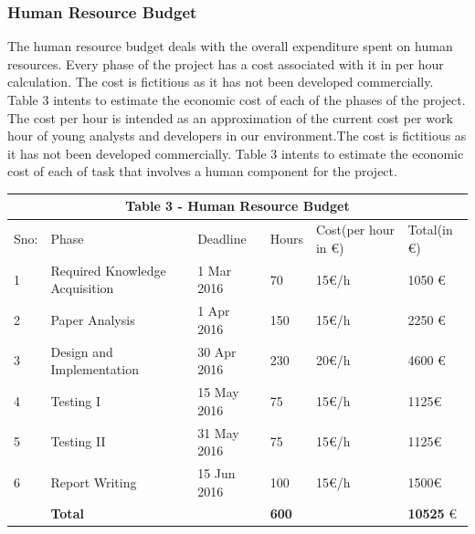 \subsubsection{Human Resource Budget}
The human resource budget deals with the overall expenditure spent on human resources.
Every phase of the project has a cost associated with it in per hour calculation.
The cost is fictitious as it has not been developed commercially. Table 3 intents to estimate the
economic cost of each of the phases of the project. The cost per hour is intended as an
approximation of the current cost per work hour of young analysts and developers in our
environment.The cost is fictitious as it has not been developed commercially. Table 3
intents to estimate the economic cost of each of task that involves a human component for the project.
\\
\begin{table}[H]
\centering
\begin{tabular}{|p{0.8cm}||p{4cm}|p{2.5cm}|p{1cm}|p{1.5cm}|p{2cm}|}
 \hline
 \multicolumn{6}{|c|}{Table 3 - Human Resource Budget} \\
 \hline
 Sno: & Phase&Deadline &Hours &Cost(per hour in \euro)&Total(in \euro)\\
 \hline
1   & Required Knowledge Acquisition  &1 Mar 2016 &  70  & 15\euro/h & 1050 \euro \\
2   & Paper Analysis  &1 Apr 2016& 150 &  15\euro/h  & 2250 \euro \\
3   & Design and Implementation&30 Apr 2016 &230&  20\euro/h  & 4600 \euro \\
4   & Testing I  &15 May 2016&75 &15\euro/h  &  1125\euro \\
5   & Testing II  &31 May 2016&75 &  15\euro/h  & 1125\euro \\
6   & Report Writing  &15 Jun 2016&100 &  15\euro/h  & 1500\euro \\
\hline
\hline
   & \textbf{Total}  &  & \textbf{600}&   & \textbf{10525} \euro \\
 \hline
\end{tabular}
\end{table}

